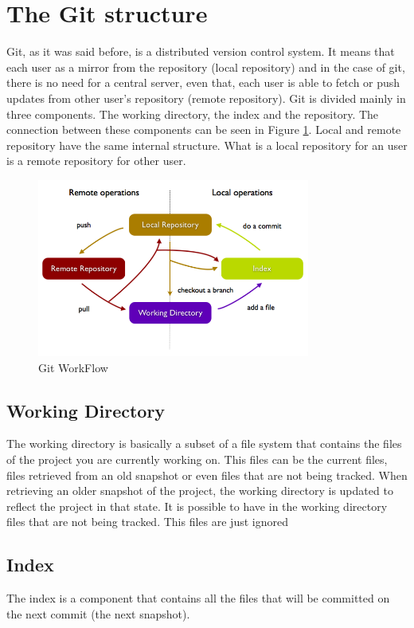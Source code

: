 \section{The Git structure}
Git, as it was said before, is a distributed version control system.
It means that each user as a mirror from the repository (local
repository) and in the case of
git, there is no need for a central server, even that, each user is able to
fetch or push updates from other user's repository (remote repository).
Git is divided mainly in three components. The working directory,
the index and the repository. The connection between these components
can be seen in Figure \ref{fig:git_structure}. Local and remote
repository have the same internal structure. What is a local
repository for an user is a remote repository for other user.

\begin{figure}[h!]
   \centering
   \includegraphics[width=0.8\textwidth]{images/git_workflow.png}
   \caption{Git WorkFlow}\label{fig:git_structure}
\end{figure}

\subsection{Working Directory}

The working directory is basically a subset of
a file system that contains the files of the project you are
currently working on. This files can be the current files, files
retrieved from an old snapshot or even files that are not being
tracked. When retrieving an older snapshot of the project, the
working directory is updated to reflect the project in that state. It
is possible to have in the working directory files that are not being
tracked. This files are just ignored

\subsection{Index}
The index is a component that contains all the files that will be committed
on the next commit (the next snapshot).

